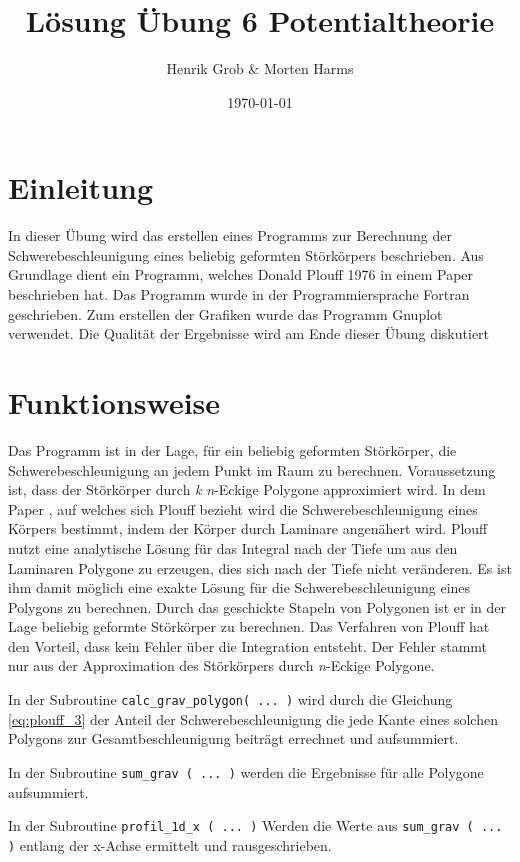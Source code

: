 \documentclass[12pt, a4paper,bibliography=totoc, twoside,BCOR=12.5mm,abstracton]{scrartcl}
\numberwithin{equation}{section}
\begin{document}
\title{Lösung Übung 6 Potentialtheorie}
\author{Henrik Grob \& Morten Harms}
\date{\today}
\maketitle

\section{Einleitung}
In dieser Übung wird das erstellen eines Programms zur Berechnung der Schwerebeschleunigung eines beliebig geformten Störkörpers beschrieben. Aus Grundlage dient ein Programm, welches Donald Plouff 1976 in einem Paper \citep{plouff:1976} beschrieben hat. Das Programm wurde in der Programmiersprache Fortran geschrieben. Zum erstellen der Grafiken wurde das Programm Gnuplot verwendet. Die Qualität der Ergebnisse wird am Ende dieser Übung diskutiert

\section{Funktionsweise}
Das Programm ist in der Lage, für ein beliebig geformten Störkörper, die Schwerebeschleunigung an jedem Punkt im Raum zu berechnen. Voraussetzung ist, dass der Störkörper durch \textit{k} \textit{n}-Eckige Polygone approximiert wird. In dem Paper \citep{talwani:1960}, auf welches sich Plouff bezieht wird die Schwerebeschleunigung eines Körpers bestimmt, indem der Körper durch Laminare angenähert wird. Plouff  nutzt eine analytische Lösung für das Integral nach der Tiefe um aus den Laminaren Polygone zu erzeugen, dies sich nach der Tiefe nicht veränderen. Es ist ihm damit möglich eine exakte Lösung für die Schwerebeschleunigung eines Polygons zu berechnen. Durch das geschickte Stapeln von Polygonen ist er in der Lage beliebig geformte Störkörper zu berechnen. Das Verfahren von Plouff hat den Vorteil, dass kein Fehler über die Integration entsteht. Der Fehler stammt nur aus der Approximation des Störkörpers durch \textit{n}-Eckige Polygone.

In der Subroutine \verb+calc_grav_polygon( ... )+ wird durch die Gleichung \ref{eq:plouff_3} der Anteil der Schwerebeschleunigung die jede Kante eines solchen Polygons zur Gesamtbeschleunigung beiträgt errechnet und aufsummiert.

In der Subroutine \verb+sum_grav ( ... )+ werden die Ergebnisse für alle Polygone aufsummiert. 

In der Subroutine \verb+profil_1d_x ( ... )+ Werden die Werte aus \verb+sum_grav ( ... )+ entlang der x-Achse ermittelt und rausgeschrieben.
\end{document}
